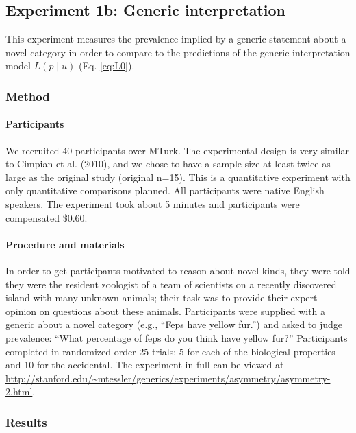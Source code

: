 \documentclass[floatsintext,man]{apa6}
\theoremstyle{definition}
\theoremstyle{definition}
\theoremstyle{definition}
\theoremstyle{remark}
\begin{document}
\subsection{Experiment 1b: Generic
interpretation}\label{experiment-1b-generic-interpretation}

This experiment measures the prevalence implied by a generic statement
about a novel category in order to compare to the predictions of the
generic interpretation model \(L(p \mid u)\) (Eq. \ref{eq:L0}).

\subsubsection{Method}\label{method-1}

\paragraph{Participants}\label{participants-1}

We recruited 40 participants over MTurk. The experimental design is very
similar to Cimpian et al. (2010), and we chose to have a sample size at
least twice as large as the original study (original n=15). This is a
quantitative experiment with only quantitative comparisons planned. All
participants were native English speakers. The experiment took about 5
minutes and participants were compensated \$0.60.

\paragraph{Procedure and materials}\label{procedure-and-materials-1}

In order to get participants motivated to reason about novel kinds, they
were told they were the resident zoologist of a team of scientists on a
recently discovered island with many unknown animals; their task was to
provide their expert opinion on questions about these animals.
Participants were supplied with a generic about a novel category (e.g.,
\enquote{Feps have yellow fur.}) and asked to judge prevalence:
\enquote{What percentage of feps do you think have yellow fur?}
Participants completed in randomized order 25 trials: 5 for each of the
biological properties and 10 for the accidental. The experiment in full
can be viewed at
\url{http://stanford.edu/~mtessler/generics/experiments/asymmetry/asymmetry-2.html}.

\subsubsection{Results}\label{results}
\end{document}
